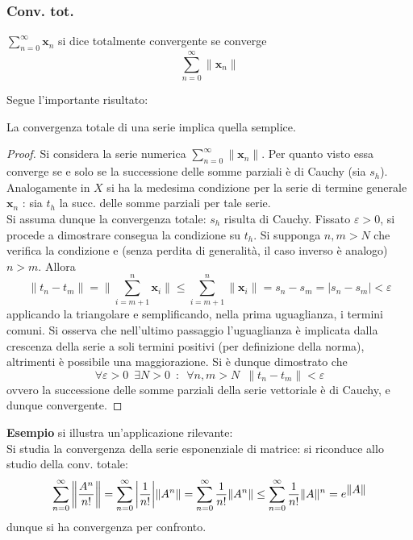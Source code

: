 \documentclass[10pt, oneside]{book}
\theoremstyle{plain}
\begin{document}
\subsubsection*{Conv. tot.}
\begin{defin}
$\displaystyle \sum\limits_{n=0}^\infty \mathbf{x}_n$ si dice totalmente convergente se converge
\[\sum\limits_{n=0}^\infty \|\mathbf{x}_n\|\]
\end{defin}
Segue l'importante risultato:
\begin{prop}
La convergenza totale di una serie implica quella semplice.
\end{prop}
\begin{proof}
Si considera la serie numerica $\displaystyle \sum\limits_{n=0}^\infty \|\mathbf{x}_n\|$. Per quanto visto essa converge se e solo se la successione delle somme parziali è di Cauchy (sia $s_h$). Analogamente in $X$ si ha la medesima condizione per la serie di termine generale $\mathbf{x}_n$ : sia $t_h$ la succ. delle somme parziali per tale serie.
\\Si assuma dunque la convergenza totale: $s_h$ risulta di Cauchy. Fissato $\varepsilon >0$, si procede a dimostrare consegua la condizione su $t_h$. Si supponga $n, m > N$ che verifica la condizione e (senza perdita di generalità, il caso inverso è analogo) $n > m$. Allora
\[\|t_n - t_m\| = \|\sum\limits_{i=m+1}^{n} \mathbf{x}_i \| \leq  \sum\limits_{i=m+1}^{n} \|\mathbf{x}_i \| = s_n - s_m = |s_n - s_m| < \varepsilon\]
applicando la triangolare e semplificando, nella prima uguaglianza, i termini comuni. Si osserva che nell'ultimo passaggio l'uguaglianza è implicata dalla crescenza della serie a soli termini positivi (per definizione della norma), altrimenti è possibile una maggiorazione. Si è dunque dimostrato che
\[\forall \varepsilon > 0 \enspace \exists N > 0 \enspace : \enspace \forall n,m > N \enspace \| t_n - t_m \| < \varepsilon\]
ovvero la successione delle somme parziali della serie vettoriale è di Cauchy, e dunque convergente.
\end{proof}

\textbf{Esempio }si illustra un'applicazione rilevante:
\\Si studia la convergenza della serie esponenziale di matrice: si riconduce allo studio della conv. totale:
\[\sum\limits_{n=0}^\infty \bigg{\|}\frac{A^n}{n!}\bigg{\|} = \sum\limits_{n=0}^\infty\bigg|\frac{1}{n!}\bigg|\|A^n\| = \sum\limits_{n=0}^\infty\frac{1}{n!}\|A^n\| \leq \sum\limits_{n=0}^\infty\frac{1}{n!}\|A\|^n = e^{\displaystyle \|A\|}\]
dunque si ha convergenza per confronto.
\end{document}
